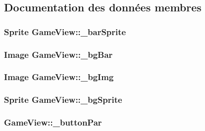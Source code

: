 \subsection{Documentation des données membres}
\hypertarget{classGameView_aa316a069a21272495b6f1cdea1d9f8eb}{
\subsubsection[{\_\-barSprite}]{\setlength{\rightskip}{0pt plus 5cm}Sprite {\bf GameView::\_\-barSprite}}}
\label{classGameView_aa316a069a21272495b6f1cdea1d9f8eb}
\hypertarget{classGameView_a11dee7b43c5c6ad7f8c5db71a2ef6878}{
\subsubsection[{\_\-bgBar}]{\setlength{\rightskip}{0pt plus 5cm}Image {\bf GameView::\_\-bgBar}}}
\label{classGameView_a11dee7b43c5c6ad7f8c5db71a2ef6878}
\hypertarget{classGameView_a29463f9906b567411726e58e4a8ce49d}{
\subsubsection[{\_\-bgImg}]{\setlength{\rightskip}{0pt plus 5cm}Image {\bf GameView::\_\-bgImg}}}
\label{classGameView_a29463f9906b567411726e58e4a8ce49d}
\hypertarget{classGameView_ac6819082a39637d9f196a2a522c03ce3}{
\subsubsection[{\_\-bgSprite}]{\setlength{\rightskip}{0pt plus 5cm}Sprite {\bf GameView::\_\-bgSprite}}}
\label{classGameView_ac6819082a39637d9f196a2a522c03ce3}
\hypertarget{classGameView_a46819410229b62084cfd927d94e7be2a}{
\subsubsection[{\_\-buttonPar}]{ {\bf GameView::\_\-buttonPar}}}
